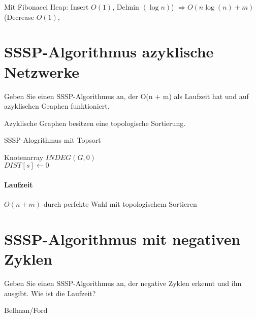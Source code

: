 Mit Fibonacci Heap: Insert $O(1)$, Delmin $(\log n)$) $ \Rightarrow O(n \log(n) + m)$ (Decrease $O(1)$, 

\section{SSSP-Algorithmus azyklische Netzwerke}
Geben Sie einen SSSP-Algorithmus an, der O(n + m) als Laufzeit hat und auf azyklischen Graphen funktioniert.
\par
Azyklische Graphen besitzen eine topologische Sortierung.

\begin{algorithm}
 \caption{SSSP-Alogrithmus mit Topsort}
 Knotenarray $INDEG(G,0)$ \\
    $DIST[s] \gets 0$\\
 
 
 
\end{algorithm}

\paragraph{Laufzeit} $O(n+m)$ durch perfekte Wahl mit topologischem Sortieren





\section{SSSP-Algorithmus mit negativen Zyklen}
\label{sec-2}
Geben Sie einen SSSP-Algorithmus an, der negative Zyklen erkennt und ihn ausgibt.
Wie ist die Laufzeit?
\par
Bellman/Ford






